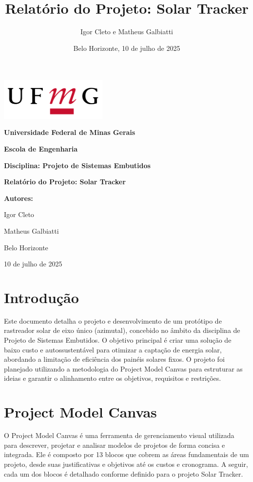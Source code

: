 \documentclass{article}
\title{Relatório do Projeto: Solar Tracker}
\author{Igor Cleto e Matheus Galbiatti}
\date{Belo Horizonte, 10 de julho de 2025}
\begin{document}
\begin{titlepage}
    \centering
    \includegraphics[width=0.4\textwidth]{logo_ufmg.png} %
    \vspace{1cm}
    
    {\huge\bfseries Universidade Federal de Minas Gerais}
    \vspace{1cm}
    
    {\Large\bfseries Escola de Engenharia}
    \vspace{1.5cm}
    
    {\Large\bfseries Disciplina: Projeto de Sistemas Embutidos}
    \vspace{2cm}
    
    {\Huge\bfseries Relatório do Projeto: Solar Tracker}
    \vspace{2cm}
    
    {\large\bfseries Autores:}
    
    {\large Igor Cleto}
    
    {\large Matheus Galbiatti}
    
    \vfill
    
    {\large Belo Horizonte}
    
    {\large 10 de julho de 2025}
\end{titlepage}

\tableofcontents
\newpage

\section{Introdução}
Este documento detalha o projeto e desenvolvimento de um protótipo de rastreador solar de eixo único (azimutal), concebido no âmbito da disciplina de Projeto de Sistemas Embutidos. O objetivo principal é criar uma solução de baixo custo e autossustentável para otimizar a captação de energia solar, abordando a limitação de eficiência dos painéis solares fixos. O projeto foi planejado utilizando a metodologia do Project Model Canvas para estruturar as ideias e garantir o alinhamento entre os objetivos, requisitos e restrições.

\section{Project Model Canvas}
O Project Model Canvas é uma ferramenta de gerenciamento visual utilizada para descrever, projetar e analisar modelos de projetos de forma concisa e integrada. Ele é composto por 13 blocos que cobrem as áreas fundamentais de um projeto, desde suas justificativas e objetivos até os custos e cronograma. A seguir, cada um dos blocos é detalhado conforme definido para o projeto Solar Tracker.
\end{document}
